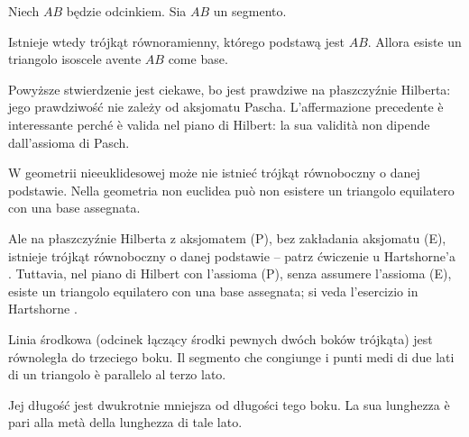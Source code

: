 

\begin{proposition}
	\label{hartshorne_52x}
    Niech $AB$ będzie odcinkiem. %
    Sia $AB$ un segmento. %

	Istnieje wtedy trójkąt równoramienny, którego podstawą jest $AB$. %
	Allora esiste un triangolo isoscele avente $AB$ come base. %

\end{proposition}

Powyższe stwierdzenie jest ciekawe, bo jest prawdziwe na płaszczyźnie Hilberta: jego prawdziwość nie zależy od aksjomatu Pascha. %
L'affermazione precedente è interessante perché è valida nel piano di Hilbert: la sua validità non dipende dall'assioma di Pasch. %



W geometrii nieeuklidesowej może nie istnieć trójkąt równoboczny o danej podstawie. %
Nella geometria non euclidea può non esistere un triangolo equilatero con una base assegnata. %

Ale na płaszczyźnie Hilberta z aksjomatem (P), bez zakładania aksjomatu (E), istnieje trójkąt równoboczny o danej podstawie -- patrz ćwiczenie u Hartshorne'a \cite[s. 184]{hartshorne_2000}. %
Tuttavia, nel piano di Hilbert con l'assioma (P), senza assumere l'assioma (E), esiste un triangolo equilatero con una base assegnata; si veda l'esercizio in Hartshorne \cite[s. 184]{hartshorne_2000}. %

\begin{proposition}
\label{hartshorne_52}%
	Linia środkowa (odcinek łączący środki pewnych dwóch boków trójkąta) jest równoległa do trzeciego boku. %
	Il segmento che congiunge i punti medi di due lati di un triangolo è parallelo al terzo lato. %


    Jej długość jest dwukrotnie mniejsza od długości tego boku. %
    La sua lunghezza è pari alla metà della lunghezza di tale lato. %
\end{proposition}


